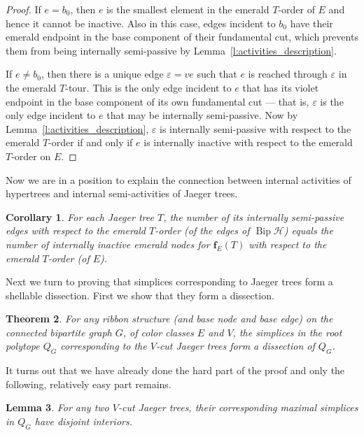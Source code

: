 \documentclass[10pt]{amsart}
\newtheorem{theo}{Theorem}[section]
\newtheorem{lemma}[theo]{Lemma}
\newtheorem{coro}[theo]{Corollary}
\theoremstyle{definition}\newtheorem{defi}[theo]{Definition}
\theoremstyle{remark}\newtheorem{rema}[theo]{Remark}
\newcommand{\HH}{\mathcal H}
\DeclareMathOperator{\bip}{Bip}
\begin{document}
\begin{proof}
If $e=b_0$, then $e$ is the smallest element in the emerald $T$-order of $E$ and hence it cannot be inactive. Also in this case, edges incident to $b_0$ have their emerald endpoint in the base component of their fundamental cut, which prevents them from being internally semi-passive by Lemma~\ref{l:activities_description}.

If $e\neq b_0$, then there is a unique edge $\varepsilon=ve$ such that $e$ is reached through $\varepsilon$ in the emerald $T$-tour. This is the only edge incident to $e$ that has its violet endpoint in the base component of its own fundamental cut --- that is, $\varepsilon$ is the only edge incident to $e$ that may be internally semi-passive. Now by Lemma~\ref{l:activities_description}, $\varepsilon$ is internally semi-passive with respect to the emerald $T$-order if and only if $e$ is internally inactive with respect to the emerald $T$-order on $E$.
\end{proof}

Now we are in a position to explain the connection between internal activities of hypertrees and internal semi-activities of Jaeger trees.

\begin{coro}\label{cor:passziv_szemipassziv}
For each Jaeger tree $T$, the number of its internally semi-passive edges with respect to the emerald $T$-order (of the edges of $\bip\HH$) equals the number of internally inactive emerald nodes for $\mathbf f_E(T)$ with respect to the emerald $T$-order (of $E$).
\end{coro}

Next we turn to proving that simplices corresponding to Jaeger trees form a shellable dissection. First we show that they form a dissection. 

\begin{theo}\label{t:J-trees_form_quasitr}
For any ribbon structure (and base node and base edge) on the connected bipartite graph $G$, of color classes $E$ and $V$, the simplices in the root polytope $Q_G$ corresponding to the $V$-cut Jaeger trees form a dissection of $Q_G$.
\end{theo}

It turns out that we have already done the hard part of the proof and only the following, relatively easy part remains.

\begin{lemma}\label{lem:disjoint}
	For any two $V$-cut Jaeger trees, their corresponding maximal simplices in $Q_G$ have disjoint interiors.
\end{lemma}
\end{document}
